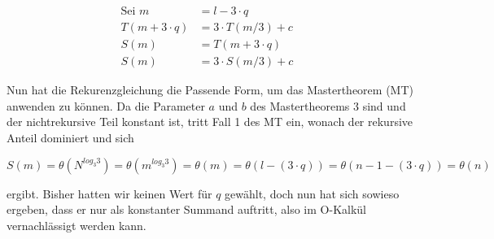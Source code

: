 \documentclass[parskip=half,a4paper]{scrartcl}
\begin{document}
\begin{equation}
\begin{aligned}
\text{Sei $m$} & = l - 3 \cdot q &\\
T(m + 3 \cdot q) &= 3 \cdot T(m / 3) + c  \\
S(m) & = T(m + 3 \cdot q) \\
S(m) & = 3 \cdot S(m / 3) + c
\end{aligned}
\end{equation}

Nun hat die Rekurenzgleichung die Passende Form, um das Mastertheorem (MT)
anwenden zu können. Da die Parameter $a$ und $b$ des Mastertheorems 3 sind und der
nichtrekursive Teil konstant ist, tritt Fall 1 des MT ein, wonach der rekursive
Anteil dominiert und sich 

$$
S(m) = \theta(N^{log_3{3}})= \theta(m^{log_3{3}}) = \theta(m) = \theta(l - (3 \cdot q)) = \theta(n - 1 - (3 \cdot q)) = \theta(n)
$$ 

ergibt. Bisher hatten wir keinen Wert für $q$ gewählt, doch nun hat sich sowieso ergeben, dass er nur als konstanter Summand auftritt, also im O-Kalkül vernachlässigt werden kann.
\end{document}
